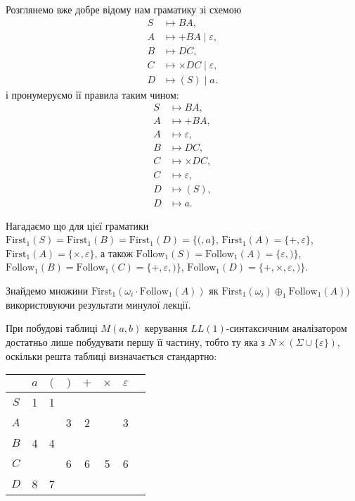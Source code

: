 Розглянемо вже добре відому нам граматику зі схемою
\begin{align*}
	S &\mapsto BA, \\
	A &\mapsto +BA \mid \varepsilon, \\
	B &\mapsto DC, \\
	C &\mapsto \times DC \mid \varepsilon, \\
	D &\mapsto (S) \mid a.
\end{align*}
і пронумеруємо її правила таким чином:
\begin{align}
	S &\mapsto BA, \\
	A &\mapsto +BA, \\
	A &\mapsto \varepsilon, \\
	B &\mapsto DC, \\
	C &\mapsto \times DC, \\
	C &\mapsto \varepsilon, \\
	D &\mapsto (S), \\
	D &\mapsto a.
\end{align}

Нагадаємо що для цієї граматики $\text{First}_1 (S) = \text{First}_1 (B) = \text{First}_1 (D) = \{(, a\}$, $\text{First}_1 (A) = \{+, \varepsilon\}$, $\text{First}_1 (A) = \{\times, \varepsilon\}$, а також $\text{Follow}_1 (S) = \text{Follow}_1 (A) = \{ \varepsilon, )\}$, $\text{Follow}_1 (B) = \text{Follow}_1 (C) = \{+, \varepsilon, )\}$, $\text{Follow}_1 (D) = \{+, \times, \varepsilon, )\}$. \medskip

Знайдемо множини $\text{First}_1(\omega_i \cdot \text{Follow}_1 (A))$ як $\text{First}_1(\omega_i) \oplus_1 \text{Follow}_1 (A))$ використовуючи результати минулої лекції. \medskip

При побудові таблиці $M(a,b)$ керування $LL(1)$-синтаксичним аналізатором достатньо лише побудувати першу її частину, тобто ту яка з $N \times (\Sigma \cup \{\varepsilon\})$, оскільки решта таблиці визначається стандартно:
\begin{table}[H]
	\centering
	\begin{tabular}{|c|c|c|c|c|c|c|c|}
		\hline
		& $a$ & $($ & $)$ & $+$ & $\times$ & $\varepsilon$ \\ \hline
		$S$ & 1 & 1 &  &  &  &   \\ \hline
		$A$ &  &  & 3 & 2 &  & 3 \\ \hline
		$B$ & 4 & 4 &  &  &  &  \\ \hline
		$C$ &  &  & 6 & 6 & 5 & 6 \\ \hline
		$D$ & 8 & 7 &  &  &  &  \\ \hline
	\end{tabular}
\end{table}

